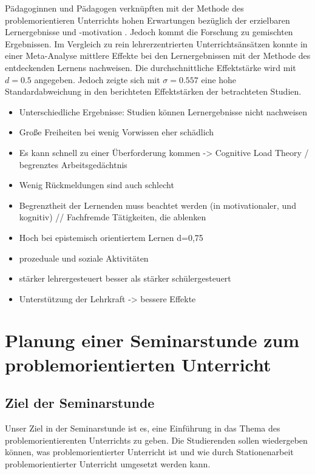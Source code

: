 \documentclass[man,12pt,a4paper]{apa6}
\begin{document}
Pädagoginnen und Pädagogen verknüpften mit der Methode des problemorientieren Unterrichts hohen Erwartungen bezüglich der erzielbaren Lernergebnisse und -motivation \parencite{kunter2013}. Jedoch kommt die Forschung zu gemischten Ergebnissen. Im Vergleich zu rein lehrerzentrierten Unterrichtsänsätzen konnte \textcite{furtak2012} in einer Meta-Analyse mittlere Effekte bei den Lernergebnissen mit der Methode des entdeckenden Lernens nachweisen. Die durchschnittliche Effektstärke wird mit $d=0.5$ angegeben. Jedoch zeigte sich mit $\sigma = 0.557$ eine hohe Standardabweichung in den berichteten Effektstärken der betrachteten Studien.



\begin{itemize}
  \item Unterschiedliche Ergebnisse: Studien können Lernergebnisse nicht nachweisen\cite{kunter2013}
  \item Große Freiheiten bei wenig Vorwissen eher schädlich\cite{kunter2013}
  \item Es kann schnell zu einer Überforderung kommen\cite{kunter2013} -> Cognitive Load Theory / begrenztes Arbeitsgedächtnis
  \item Wenig Rückmeldungen sind auch schlecht\cite{kunter2013}
  \item Begrenztheit der Lernenden muss beachtet werden (in motivationaler, und kognitiv) // Fachfremde Tätigkeiten, die ablenken\cite{kunter2013}
  \item Hoch bei epistemisch orientiertem Lernen d=0,75
  \item prozeduale und soziale Aktivitäten
  \item stärker lehrergesteuert besser als stärker schülergesteuert
  \item Unterstützung der Lehrkraft -> bessere Effekte
\end{itemize}

\section{Planung einer Seminarstunde zum problemorientierten Unterricht}

\subsection{Ziel der Seminarstunde}

Unser Ziel in der Seminarstunde ist es, eine Einführung in das Thema des problemorientierenten Unterrichts zu geben. Die Studierenden sollen wiedergeben können, was problemorientierter Unterricht ist und wie durch Stationenarbeit problemorientierter Unterricht umgesetzt werden kann.
\end{document}
